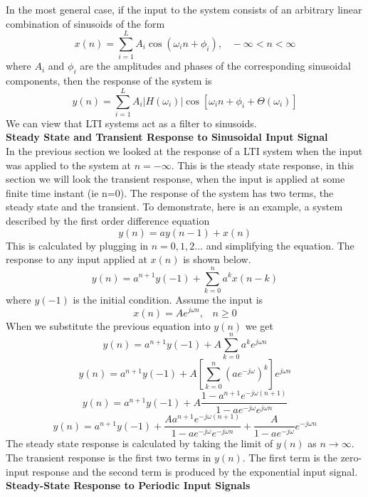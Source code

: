 \documentclass{article} %
\begin{document}
	In the most general case, if the input to the system consists of an arbitrary linear combination of sinusoids of the form
	\begin{equation}
	x(n) = \sum_{i=1}^{L}A_i \cos (\omega_i n + \phi_i), \;\;\; -\infty < n < \infty
	\end{equation}
	where $A_i$ and $\phi_i$ are the amplitudes and phases of the corresponding sinusoidal components, then the response of the system is
	\begin{equation}
	y(n) = \sum_{i=1}^{L}A_i |H(\omega_i)|\cos[\omega_i n + \phi_i + \Theta (\omega_i)]
	\end{equation}
	We can view that LTI systems act as a filter to sinusoids.  \\
	\textbf{Steady State and Transient Response to Sinusoidal Input Signal}\\
	
	In the previous section we looked at the response of a LTI system when the input was applied to the system at $n=-\infty$. This is the steady state response, in this section we will look the transient response, when the input is applied at some finite time instant (ie n=0). The response of the system has two terms, the steady state and the transient. To demonstrate, here is an example, a system described by the first order difference equation
	\begin{equation}
	y(n) = ay(n-1) + x(n)
	\end{equation}
	This is calculated by plugging in $n=0,1,2...$ and simplifying the equation. The response to any input applied at $x(n)$ is shown below. 
	\begin{equation}
	y(n) = a^{n+1}y(-1) + \sum_{k=0}^{n}a^kx(n-k)
	\end{equation}
	where $y(-1)$ is the initial condition. Assume the input is
	\begin{equation}
	x(n) = Ae^{j\omega n}, \;\;\; n \ge 0
	\end{equation}
	When we substitute the previous equation into $y(n)$ we get
	\begin{equation}
	y(n) = a^{n+1}y(-1)+A\sum_{k=0}^n a^ke^{j\omega n}
	\end{equation}
	\begin{equation}
	y(n) = a^{n+1}y(-1)+A[\sum_{k=0}^n (ae^{-j\omega})^k]e^{j\omega n}
	\end{equation}
	\begin{equation}
	y(n) = a^{n+1}y(-1) + A\frac{1-a^{n+1}e^{-j\omega (n+1)}}{1-ae^{-j\omega}e^{j\omega n}}
	\end{equation}
	\begin{equation}
	y(n) = a^{n+1}y(-1)+ \frac{Aa^{n+1}e^{-j\omega (n+1)}}{1-ae^{-j\omega}e^{-j\omega n}} + \frac{A}{1-ae^{-j\omega}}e^{-j\omega n}
	\end{equation}
	The steady state response is calculated by taking the limit of $y(n)$ as $n \rightarrow \infty$. The transient response is the first two terms in $y(n)$. The first term is the zero-input response and the second term is produced by the exponential input signal.\\
	\textbf{Steady-State Response to Periodic Input Signals}\\
	
\end{document}
